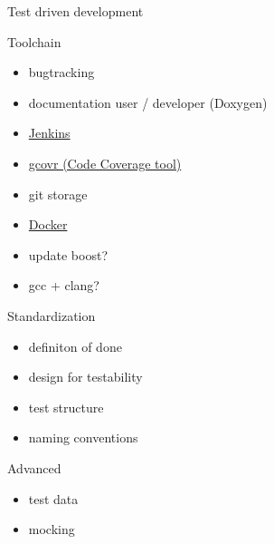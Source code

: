 \documentclass{beamer}
\begin{document}
    \begin{frame}{Test driven development}
        \centering
    \end{frame}

    \begin{frame}{Toolchain}
        \begin{itemize}
            \item bugtracking
            \item documentation user / developer (Doxygen)
            \item \href{https://www.jenkins.io/doc/}{Jenkins}
            \item \href{https://www.gcovr.com/en/stable/guide.html}{gcovr (Code Coverage tool)}
            \item git storage
            \item \href{https://docs.docker.com/}{Docker}
            \item update boost?
            \item gcc + clang?
        \end{itemize}
    \end{frame}

    \begin{frame}{Standardization}
        \begin{itemize}
            \item definiton of done
            \item design for testability
            \item test structure
            \item naming conventions
        \end{itemize}
    \end{frame}

    \begin{frame}{Advanced}
        \begin{itemize}
            \item test data%
            \item mocking
        \end{itemize}
    \end{frame}
    
\end{document}
